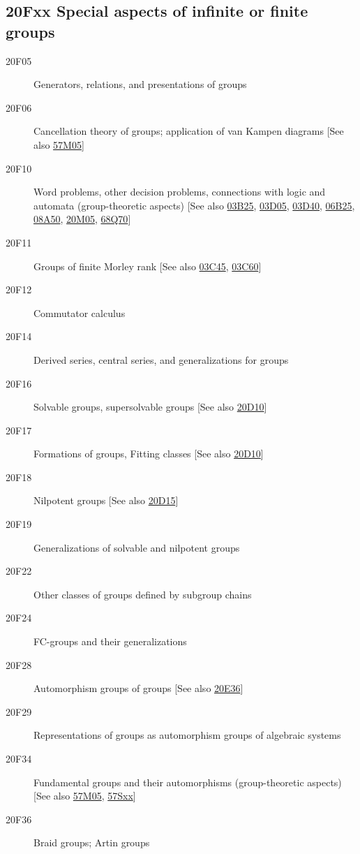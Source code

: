 \subsection*{20Fxx  Special aspects of infinite or finite groups }\label{20Fxx}
\begin{description} 
\item [20F05]\label{20F05} Generators, relations, and presentations of groups
\item [20F06]\label{20F06} Cancellation theory of groups; application of van Kampen diagrams [See also \hyperref[57M05]{57M05}]
\item [20F10]\label{20F10} Word problems, other decision problems, connections with logic and automata (group-theoretic aspects) [See also \hyperref[03B25]{03B25}, \hyperref[03D05]{03D05}, \hyperref[03D40]{03D40}, \hyperref[06B25]{06B25}, \hyperref[08A50]{08A50}, \hyperref[20M05]{20M05}, \hyperref[68Q70]{68Q70}]
\item [20F11]\label{20F11} Groups of finite Morley rank [See also \hyperref[03C45]{03C45}, \hyperref[03C60]{03C60}]
\item [20F12]\label{20F12} Commutator calculus
\item [20F14]\label{20F14} Derived series, central series, and generalizations for  groups
\item [20F16]\label{20F16} Solvable groups, supersolvable groups [See also \hyperref[20D10]{20D10}]
\item [20F17]\label{20F17} Formations of groups, Fitting classes [See also \hyperref[20D10]{20D10}]
\item [20F18]\label{20F18} Nilpotent groups [See also \hyperref[20D15]{20D15}]
\item [20F19]\label{20F19} Generalizations of solvable and nilpotent groups
\item [20F22]\label{20F22} Other classes of groups defined by subgroup chains
\item [20F24]\label{20F24} FC-groups and their generalizations
\item [20F28]\label{20F28} Automorphism groups of groups [See also \hyperref[20E36]{20E36}]
\item [20F29]\label{20F29} Representations of groups as automorphism groups of algebraic systems
\item [20F34]\label{20F34} Fundamental groups and their automorphisms (group-theoretic aspects) [See also \hyperref[57M05]{57M05}, \hyperref[57Sxx]{57Sxx}]
\item [20F36]\label{20F36} Braid groups; Artin groups

\end{description}
